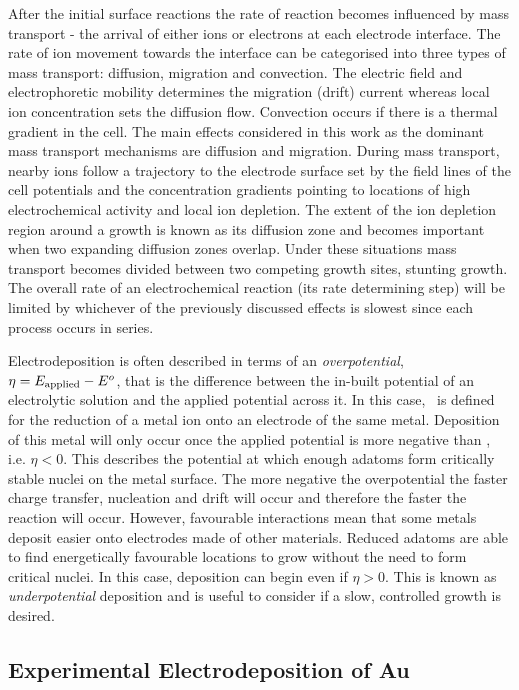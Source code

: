 \documentclass{article}
\begin{document}
After the initial surface reactions the rate of reaction becomes influenced by mass transport - the arrival of either ions or electrons at each electrode interface. The rate of ion movement towards the interface can be categorised into three types of mass transport: diffusion, migration and convection. The electric field and electrophoretic mobility determines the migration (drift) current whereas local ion concentration sets the diffusion flow. Convection occurs if there is a thermal gradient in the cell. The main effects considered in this work as the dominant mass transport mechanisms are diffusion and migration.
During mass transport, nearby ions follow a trajectory to the electrode surface set by the field lines of the cell potentials and the concentration gradients pointing to locations of high electrochemical activity and local ion depletion. The extent of the ion depletion region around a growth is known as its diffusion zone and becomes important when two expanding diffusion zones overlap. Under these situations mass transport becomes divided between two competing growth sites, stunting growth. The overall rate of an electrochemical reaction (its rate determining step) will be limited by whichever of the previously discussed effects is slowest since each process occurs in series.

Electrodeposition is often described in terms of an \emph{overpotential}, $\eta = E_{\mathrm{applied}} - E^o$, that is the difference between the in-built potential of an electrolytic solution and the applied potential across it.  In this case, \Esp\ is defined for the reduction of a metal ion onto an electrode of the same metal. Deposition of this metal will only occur once the applied potential is more negative than \Esp, i.e. $\eta<0$. This describes the potential at which enough adatoms form critically stable nuclei on the metal surface. The more negative the overpotential the faster charge transfer, nucleation and drift will occur and therefore the faster the reaction will occur. However, favourable interactions mean that some metals deposit easier onto electrodes made of other materials. Reduced adatoms are able to find energetically favourable locations to grow without the need to form critical nuclei. In this case, deposition can begin even if $\eta>0$. This is known as \emph{underpotential} deposition and is useful to consider if a slow, controlled growth is desired.

\subsection{Experimental Electrodeposition of Au}
\end{document}
